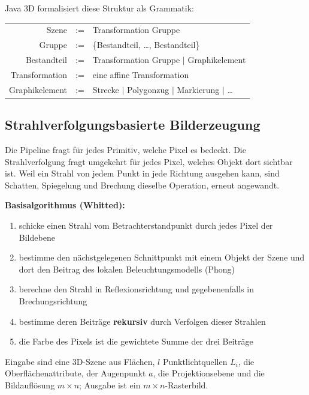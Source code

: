 \documentclass[12pt, a4paper]{article}
\begin{document}
Java 3D formalisiert diese Struktur als Grammatik:

\begin{center}
\begin{tabular}{@{}rcl@{}}
Szene & := & Transformation Gruppe \\
Gruppe & := & \{Bestandteil, \ldots, Bestandteil\} \\
Bestandteil & := & Transformation Gruppe $\mid$ Graphikelement \\
Transformation & := & eine affine Transformation \\
Graphikelement & := & Strecke $\mid$ Polygonzug $\mid$ Markierung $\mid$ \ldots \\
\end{tabular}
\end{center}

\subsection{Strahlverfolgungsbasierte Bilderzeugung}

Die Pipeline fragt für jedes Primitiv, welche Pixel es bedeckt. Die Strahlverfolgung
fragt umgekehrt für jedes Pixel, welches Objekt dort sichtbar ist. Weil ein Strahl von
jedem Punkt in jede Richtung ausgehen kann, sind Schatten, Spiegelung und Brechung
dieselbe Operation, erneut angewandt.

\begin{definitionbox}
\textbf{Basisalgorithmus (Whitted):}
\begin{enumerate}
  \item schicke einen Strahl vom Betrachterstandpunkt durch jedes Pixel der Bildebene
  \item bestimme den nächstgelegenen Schnittpunkt mit einem Objekt der Szene und dort
        den Beitrag des lokalen Beleuchtungsmodells (Phong)
  \item berechne den Strahl in Reflexionsrichtung und gegebenenfalls in
        Brechungsrichtung
  \item bestimme deren Beiträge \textbf{rekursiv} durch Verfolgen dieser Strahlen
  \item die Farbe des Pixels ist die gewichtete Summe der drei Beiträge
\end{enumerate}
\end{definitionbox}

Eingabe sind eine 3D-Szene aus Flächen, $l$ Punktlichtquellen $L_i$, die
Oberflächenattribute, der Augenpunkt $a$, die Projektionsebene und die Bildauflösung
$m \times n$; Ausgabe ist ein $m \times n$-Rasterbild.
\end{document}
